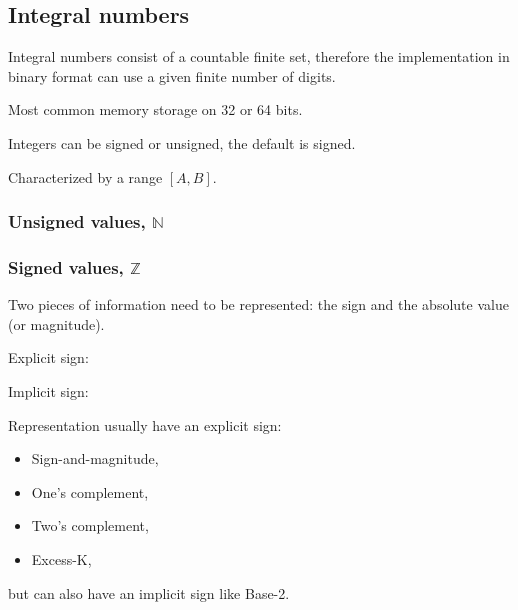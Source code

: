 \documentclass{article}
\begin{document}
\subsection{Integral numbers}

Integral numbers consist of a countable finite set, therefore the implementation in binary format can use a given finite number of digits.

Most common memory storage on 32 or 64 bits.

Integers can be signed or unsigned, the default is signed.

Characterized by a range $[A,B]$.

\subsubsection{Unsigned values, $\mathbb N$}

\begin{center}
\end{center}

\subsubsection{Signed values, $\mathbb Z$}

Two pieces of information need to be represented: the sign and the absolute value (or magnitude). 

Explicit sign:
\begin{center}
\end{center}

Implicit sign:
\begin{center}
\end{center}

Representation usually have an explicit sign:
\begin{itemize}
\item Sign-and-magnitude,
\item One's complement,
\item Two's complement,
\item Excess-K,
\end{itemize}
but can also have an implicit sign like Base-2.
\end{document}
